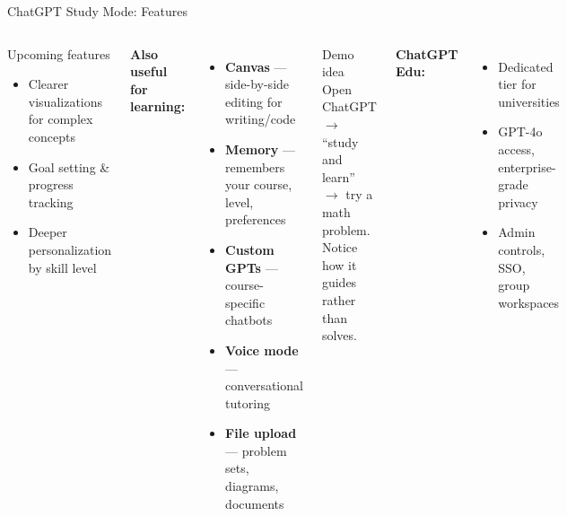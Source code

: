 \documentclass[aspectratio=169]{beamer}
\begin{document}
\begin{frame}{ChatGPT Study Mode: Features}
\small
\begin{columns}[T]
\begin{exampleblock}{Upcoming features}
\begin{itemize}\setlength\itemsep{0em}
  \item Clearer visualizations for complex concepts
  \item Goal setting \& progress tracking
  \item Deeper personalization by skill level
\end{itemize}
\end{exampleblock}

\smallskip
\textbf{\color{popblue}Also useful for learning:}
\begin{itemize}\setlength\itemsep{0em}
  \item \textbf{Canvas} --- side-by-side editing for writing/code
  \item \textbf{Memory} --- remembers your course, level, preferences
  \item \textbf{Custom GPTs} --- course-specific chatbots
  \item \textbf{Voice mode} --- conversational tutoring
  \item \textbf{File upload} --- problem sets, diagrams, documents
\end{itemize}

\begin{alertblock}{Demo idea}
Open ChatGPT $\to$ ``study and learn'' $\to$ try a math problem. Notice how it guides rather than solves.
\end{alertblock}

\smallskip
\textbf{\color{popblue}ChatGPT Edu:}
\begin{itemize}\setlength\itemsep{0em}
  \item Dedicated tier for universities
  \item GPT-4o access, enterprise-grade privacy
  \item Admin controls, SSO, group workspaces
\end{itemize}
\end{columns}
\end{frame}
\end{document}
